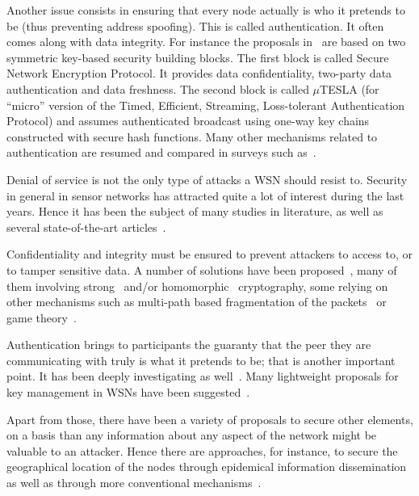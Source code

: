Another issue consists in ensuring that every node actually is who it pretends to be (thus preventing address spoofing).
This is called authentication.
It often comes along with data integrity.
For instance the proposals in~\cite{PSWCT02} are based on two symmetric key-based security building blocks.
The first block is called Secure Network Encryption Protocol.
It provides data confidentiality, two-party data authentication and data freshness.
The second block is called $\mu$TESLA (for ``micro'' version of the Timed, Efficient, Streaming, Loss-tolerant Authentication Protocol) and assumes authenticated broadcast using one-way key chains constructed with secure hash functions.
Many other mechanisms related to authentication are resumed and compared in surveys such as~\cite{SOBMCN11}.




Denial of service is not the only type of attacks a WSN should resist to.
Security in general in sensor networks has attracted quite a lot of interest during the last years.
Hence it has been the subject of many studies in literature, as well as several state-of-the-art articles~\cite{DYK12,AD14}.

Confidentiality and integrity must be ensured to prevent attackers to access to, or to tamper sensitive data.
A number of solutions have been proposed~\cite{OX09}, many of them involving strong~\cite{SOBMCN11} and/or homomorphic~\cite{BBTY14} cryptography, some relying on other mechanisms such as multi-path based fragmentation of the packets~\cite{MMB13} or game theory~\cite{SWKC12}.

Authentication brings to participants the guaranty that the peer they are communicating with truly is what it pretends to be; that is another important point.
It has been deeply investigating as well~\cite{GWZC13}.
Many lightweight proposals for key management in WSNs have been suggested~\cite{GWZCK13,BSK13}.

Apart from those, there have been a variety of proposals to secure other elements, on a basis than any information about any aspect of the network might be valuable to an attacker.
Hence there are approaches, for instance, to secure the geographical location of the nodes through epidemical information dissemination~\cite{KDA14} as well as through more conventional mechanisms~\cite{GK13}.
